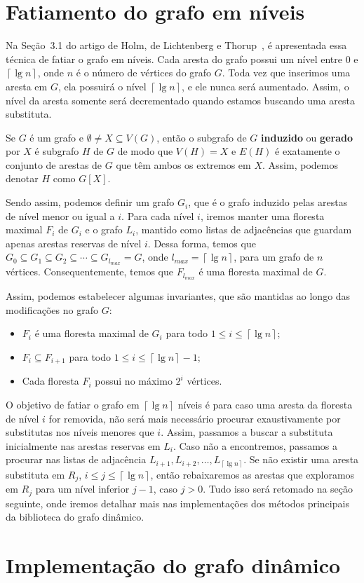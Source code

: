 \newpage

\section{Fatiamento do grafo em níveis}

Na Seção~3.1 do artigo de Holm, de Lichtenberg e Thorup~\cite{jacob_holm}, é apresentada essa técnica de fatiar o grafo em níveis. Cada aresta do grafo possui um nível entre $0$ e $\left\lceil \lg n \right\rceil$, onde $n$ é o número de vértices do grafo $G$. Toda vez que inserimos uma aresta em $G$, ela possuirá o nível $\left\lceil \lg n \right\rceil$, e ele nunca será aumentado. Assim, o nível da aresta somente será decrementado quando estamos buscando uma aresta substituta. 

Se $G$ é um grafo e $\emptyset \neq X \subseteq V(G)$, então o subgrafo de $G$ \textbf{induzido} ou \textbf{gerado} por $X$ é subgrafo $H$ de $G$ de modo que $V(H) = X$ e $E(H)$ é exatamente o conjunto de arestas de $G$ que têm ambos os extremos em $X$. Assim, podemos denotar $H$ como $G[X]$.

Sendo assim, podemos definir um grafo $G_i$, que é o grafo induzido pelas arestas de nível menor ou igual a $i$. Para cada nível $i$, iremos manter uma floresta maximal $F_i$ de $G_i$ e o grafo $L_i$, mantido como listas de adjacências que guardam apenas arestas reservas de nível $i$. Dessa forma, temos que $G_0 \subseteq G_1 \subseteq G_2 \subseteq \cdots \subseteq G_{l_{max}} = G$, onde $l_{max} =  \left\lceil \lg n \right\rceil$, para um grafo de $n$ vértices. Consequentemente, temos que $F_{l_{max}}$ é uma floresta maximal de $G$. 

Assim, podemos estabelecer algumas invariantes, que são mantidas ao longo das modificações no grafo $G$:

\begin{itemize}
    \item $F_i$ é uma floresta maximal de $G_i$ para todo $1 \leq i \leq  \left\lceil \lg n \right\rceil$;
    
    \item $F_i \subseteq F_{i+1}$ para todo $1 \leq i \leq \left\lceil \lg n \right\rceil - 1$;
    
    \item Cada floresta $F_i$ possui no máximo $2^i$ vértices.
\end{itemize}

O objetivo de fatiar o grafo em  $\left\lceil \lg n \right\rceil$ níveis é para caso uma aresta da floresta de nível $i$ for removida, não será mais necessário procurar exaustivamente por substitutas nos níveis menores que $i$. Assim, passamos a buscar a substituta inicialmente nas arestas reservas em $L_i$. Caso não a encontremos, passamos a procurar nas listas de adjacência $L_{i+1}, L_{i+2}, \ldots, L_{ \left\lceil \lg n \right\rceil}$. Se não existir uma aresta substituta em $R_j$, $i \leq j \leq  \left\lceil \lg n \right\rceil$, então rebaixaremos as arestas que exploramos em $R_j$ para um nível inferior $j-1$, caso $j > 0$. Tudo isso será retomado na seção seguinte, onde iremos detalhar mais nas implementações dos métodos principais da biblioteca do grafo dinâmico. 

\section{Implementação do grafo dinâmico}